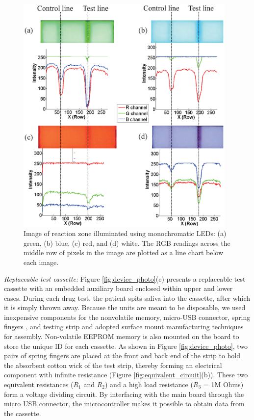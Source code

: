\begin{figure}[ht]
\begin{center}
\includegraphics[height=12cm]{image/ket/all_color.eps}
\caption{Image of reaction zone illuminated using monochromatic LEDs: (a) green, (b) blue, (c) red, and (d) white. The RGB readings across the middle row of pixels in the image are plotted as a line chart below each image.}
\label{fig:all_color}
\end{center}
\end{figure}

\textit{Replaceable test cassette:}
\newline
Figure \ref{fig:device_photo}(c) presents a replaceable test cassette with an embedded auxiliary board enclosed within upper and lower cases. During each drug test, the patient spits saliva into the cassette, after which it is simply thrown away. Because the units are meant to be disposable, we used inexpensive components for the nonvolatile memory, micro-USB connector, spring fingers \cite{springfinger}, and testing strip and adopted surface mount manufacturing techniques for assembly. Non-volatile EEPROM memory is also mounted on the board to store the unique ID for each cassette. As shown in Figure \ref{fig:device_photo}, two pairs of spring fingers are placed at the front and back end of the strip to hold the absorbent cotton wick of the test strip, thereby forming an electrical component with infinite resistance (Figure \ref{fig:equivalent_circuit}(b)). These two equivalent resistances ($R_1$ and $R_2$) and a high load resistance ($R_3$ = 1M Ohms) form a voltage dividing circuit. By interfacing with the main board through the micro USB connector, the microcontroller makes it possible to obtain data from the cassette.

